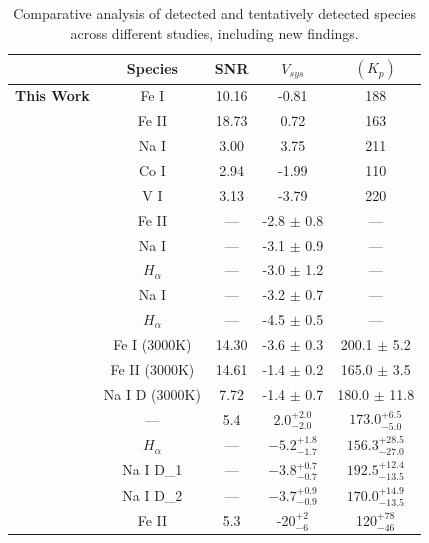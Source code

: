 \documentclass[twocolumn]{aastex631}
\begin{document}
        \begin{table}\label{tab:results-summary}
            \centering
            \caption{Comparative analysis of detected and tentatively detected species across different studies, including new findings.}
            
            {\footnotesize %
            \setlength\tabcolsep{4pt} %
            \begin{tabular}{lcccc}
                \hline
                & Species & SNR & $V_{sys}$ & $(K_p)$ \\
                \hline
                \textbf{This Work} & Fe I & 10.16 & -0.81 & 188 \\
                & Fe II & 18.73 & 0.72 & 163 \\
                & Na I & 3.00 & 3.75 & 211 \\
                & Co I & 2.94 & -1.99 & 110 \\
                & V I & 3.13 & -3.79 & 220 \\
                \citep{CasasayasBarris2020} & Fe II & --- & -2.8 $\pm$ 0.8 & --- \\
                & Na I & --- & -3.1 $\pm$ 0.9 & --- \\
                & $H_{\alpha}$ & --- & -3.0 $\pm$ 1.2 & --- \\
                \citep{Hoeijmakers2020} & Na I & --- & -3.2 $\pm$ 0.7 & --- \\
                & $H_{\alpha}$ & --- & -4.5 $\pm$ 0.5 & --- \\
                \citep{Nugroho2020} & Fe I (3000K) & 14.30 & -3.6  $\pm$ 0.3 & 200.1 $\pm$ 5.2 \\
                & Fe II (3000K) & 14.61 & -1.4 $\pm$ 0.2 & 165.0 $\pm$ 3.5 \\
                & Na I D (3000K) & 7.72 & -1.4 $\pm$ 0.7 & 180.0 $\pm$ 11.8 \\
                \citep{Kasper2022} & --- & 5.4 & $2.0^{+2.0}_{-2.0}$ & $173.0^{+6.5}_{-5.0}$ \\
                \citep{Sicilia2022} & $H_{\alpha}$ & --- & $-5.2^{+1.8}_{-1.7}$ & $156.3^{+28.5}_{-27.0}$ \\
                & Na I D_1 & --- & $-3.8^{+0.7}_{-0.7}$ & $192.5^{+12.4}_{-13.5}$ \\
                & Na I D_2 & --- & $-3.7^{+0.9}_{-0.9}$ & $170.0^{+14.9}_{-13.5}$ \\
                \citep{BelloArufe2022} & Fe II & 5.3 & -20$^{+2}_{-6}$ & 120$^{+78}_{-46}$ \\
                
                \hline

            \end{tabular}}
            
        \end{table}
\end{document}
